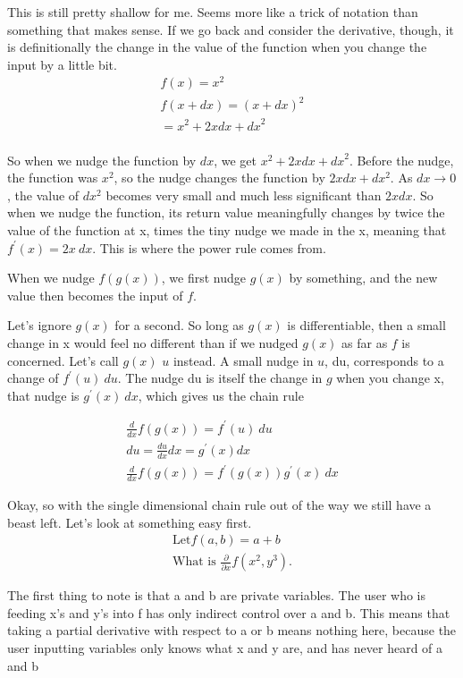 \documentclass[12pt, letterpaper]{article}
\begin{document}
This is still pretty shallow for me. Seems more like a trick of notation than something that makes sense. If we go back and consider the derivative, though, it is definitionally the change in the value of the function when you change the input by a little bit.
\begin{gather*}
    f(x) = x^2\\
    f(x + dx) = (x+dx)^2\\
    = x^2 + 2xdx + {dx}^2\\
\end{gather*}

So when we nudge the function by $dx$, we get $x^2 + 2xdx + {dx}^2$. Before the nudge, the function was $x^2$, so the nudge changes the function by $2xdx + dx^2$. As $dx \to 0$, the value of $dx^2$ becomes very small and much less significant than $2xdx$. So when we nudge the function, its return value meaningfully changes by twice the value of the function at x, times the tiny nudge we made in the x, meaning that $f^\prime (x) = 2x\ dx$. This is where the power rule comes from.

When we nudge $f(g(x))$, we first nudge $g(x)$ by something, and the new value then becomes the input of $f$.

Let's ignore $g(x)$ for a second. So long as $g(x)$ is differentiable, then a small change in x would feel no different than if we nudged $g(x)$ as far as $f$ is concerned. 
Let's call $g(x)$ $u$ instead. A small nudge in $u$, du, corresponds to a change of $f^\prime (u)\ du$. The nudge du is itself the change in $g$ when you change x, that nudge is $g^\prime (x)\ dx$, which gives us the chain rule

\begin{gather*}
    \frac{d}{dx} f(g(x)) = f^\prime (u)\ du\\
    du = \frac{du}{dx}dx = g^\prime (x) dx\\
    \frac{d}{dx} f(g(x)) = f^\prime (g(x)) g^\prime (x)\ dx
\end{gather*}

Okay, so with the single dimensional chain rule out of the way we still have a beast left. Let's look at something easy first.
\begin{gather*}
    \text{Let} f(a, b) = a + b\\
    \text{What is } \frac{\partial}{\partial x}f(x^2, y^3).
\end{gather*}

The first thing to note is that a and b are private variables. The user who is feeding x's and y's into f has only indirect control over a and b. This means that taking a partial derivative with respect to a or b means nothing here, because the user inputting variables only knows what x and y are, and has never heard of a and b
\end{document}

